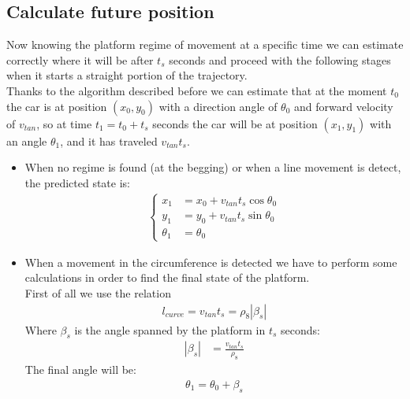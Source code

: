 \subsection{Calculate future position}
Now knowing the platform regime of movement at a specific time we can estimate correctly where it will be after $t_s$ seconds and proceed with the following stages when it starts a straight portion of the trajectory.\\
Thanks to the algorithm described before we can estimate that at the moment $t_0$ the car is at position $(x_0,y_0)$ with a direction angle of $\theta_0$ and forward velocity of $v_{tan}$, so at time $t_1 = t_0 + t_s$ seconds the car will be at position $(x_1,y_1)$ with an angle  $\theta_1$, and it has traveled  $v_{tan}t_s$.
\begin{itemize}
\item When no regime is found (at the begging) or when a line movement is detect, the predicted state is:
\begin{align}
\begin{cases}
x_1 &= x_0 + v_{tan}t_s\cos{\theta_0}\\[5pt]
y_1 &= y_0 + v_{tan}t_s\sin{\theta_0}\\[5pt]
\theta_1 &= \theta_0
\end{cases}
\label{eq:line_future_pose}
\end{align}
\item When a movement in the circumference is detected we have to perform some calculations in order to find the final state of the platform.\\ 
First of all we use the relation 
\begin{align*}
l_{curve} = v_{tan}t_s = \rho_8|\beta_s|
\end{align*}
Where $\beta_s$ is the angle spanned by the platform in $t_s$ seconds:
\begin{align}
|\beta_{s}| &= \frac{v_{tan}t_s}{\rho_8}
 \label{eq:anglespanned}
\end{align}
The final angle will be:
 \begin{align}
 \theta_1 = \theta_0 + \beta_s
 \label{eq:anglefinal}
 \end{align}


\end{itemize}
